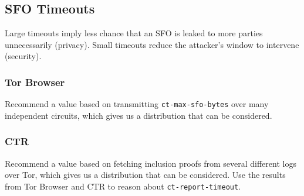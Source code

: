 \subsection{SFO Timeouts}
Large timeouts imply less chance that an SFO is leaked to more parties
unnecessarily (privacy).  Small timeouts reduce the attacker's window to
intervene (security).

\subsubsection{Tor Browser}
Recommend a value based on transmitting \texttt{ct-max-sfo-bytes} over many
independent circuits, which gives us a distribution that can be considered.

\subsubsection{CTR}
Recommend a value based on fetching inclusion proofs from several different
logs over Tor, which gives us a distribution that can be considered.  Use the
results from Tor Browser and CTR to reason about \texttt{ct-report-timeout}.
